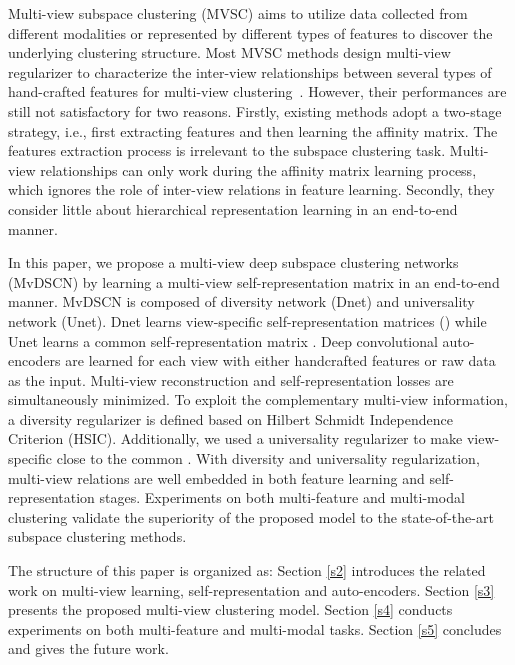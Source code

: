 \documentclass[journal]{IEEEtran}
\begin{document}
Multi-view subspace clustering (MVSC) aims to utilize data collected from different modalities or represented by different types of features to discover the underlying clustering structure.
Most MVSC methods design multi-view regularizer to characterize the inter-view relationships between several types of hand-crafted features for multi-view clustering~\cite{Cui2007NonredundantMC,Gnnemann2012MultiviewCU,Wang2015RobustSC,Zhang2017LatentMS,Xu2016DiscriminativelyEK,Zhao2017MultiViewCV,Wang2018PartialMC}.
However, their performances are still not satisfactory for two reasons.
Firstly, existing methods adopt a two-stage strategy, i.e., first extracting features and then learning the affinity matrix. The features extraction process is irrelevant to the subspace clustering task.
Multi-view relationships can only work during the affinity matrix learning process, which ignores the role of inter-view relations in feature learning.
Secondly, they consider little about hierarchical representation learning in an end-to-end manner.

In this paper, we propose a multi-view deep subspace clustering networks (MvDSCN) by learning a multi-view self-representation matrix in an end-to-end manner.
MvDSCN is composed of diversity network (Dnet) and universality network (Unet).
Dnet learns view-specific self-representation matrices () while Unet learns a common self-representation matrix .
Deep convolutional auto-encoders are learned for each view with either handcrafted features or raw data as the input.
Multi-view reconstruction and self-representation losses are simultaneously minimized.
To exploit the complementary multi-view information, a diversity regularizer is defined based on Hilbert Schmidt Independence Criterion (HSIC).
Additionally, we used a universality regularizer to make view-specific  close to the common .
With diversity and universality regularization, multi-view relations are well embedded in both feature learning and self-representation stages.
Experiments on both multi-feature and multi-modal clustering validate the superiority of the proposed model to the state-of-the-art subspace clustering methods.

The structure of this paper is organized as:
Section \ref{s2} introduces the related work on multi-view learning, self-representation and auto-encoders.
Section \ref{s3} presents the proposed multi-view clustering model.
Section \ref{s4} conducts experiments on both multi-feature and multi-modal tasks.
Section \ref{s5} concludes and gives the future work.
\end{document}
